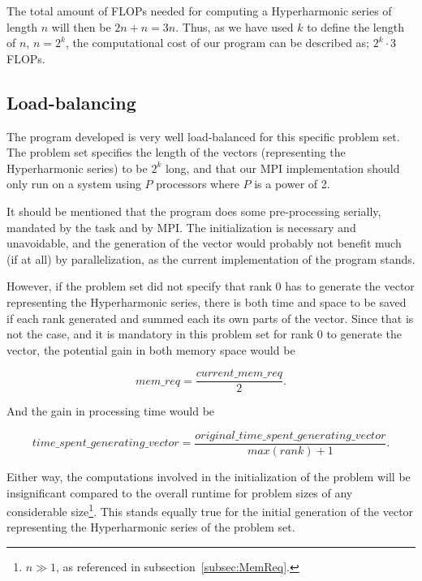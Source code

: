\documentclass[fontsize=11pt,paper=a4,titlepage]{report}
\begin{document}
The total amount of FLOPs needed for computing a Hyperharmonic series of length
$n$ will then be $2n + n = 3n$. Thus, as we have used $k$ to define the length
of $n$, $n=2^k$, the computational cost of our program can be described as;
$2^k\cdot 3$ FLOPs.

\subsection{Load-balancing}

The program developed is very well load-balanced for this specific problem set.
The problem set specifies the length of the vectors (representing the
Hyperharmonic series) to be $2^k$ long, and that our MPI implementation should
only run on a system using $P$ processors where $P$ is a power of 2.

It should be mentioned that the program does some pre-processing serially,
mandated by the task and by MPI. The initialization is necessary and
unavoidable, and the generation of the vector would probably not benefit much
(if at all) by parallelization, as the current implementation of the program stands.

However, if the problem set did not specify that rank 0 has to generate the
vector representing the Hyperharmonic series, there is both time and space to be
saved if each rank generated and  summed each its own parts of the vector. Since
that is not the case, and it is mandatory in this problem set for rank 0 to
generate the vector, the potential gain in both memory space would be

\begin{equation}
	mem\_req = \frac {current\_mem\_req}{2}.
	\label{eq:mem-req}
\end{equation}

And the gain in processing time would be

\begin{equation}
	time\_spent\_generating\_vector = \frac
{original\_time\_spent\_generating\_vector} {max(rank)+1}.
	\label{eq:time-req}
\end{equation}

Either way, the computations involved in the initialization of the
problem will be insignificant compared to the overall runtime for problem sizes
of any considerable size\footnote{$n \gg 1$, as referenced in
subsection~\ref{subsec:MemReq}.}. This stands equally true for the initial
generation of the vector representing the Hyperharmonic series of the problem
set.
\end{document}
